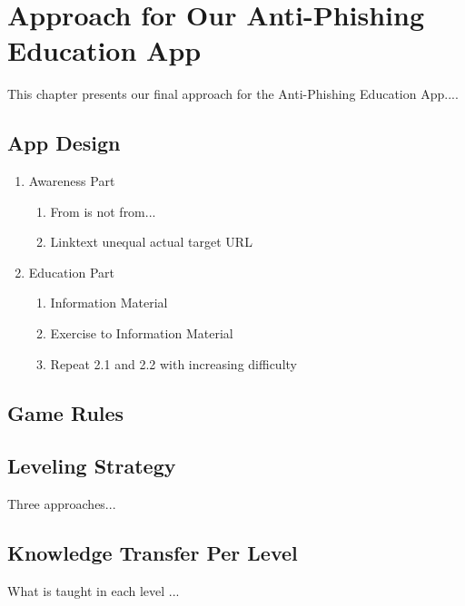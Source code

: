 
\section{Approach for Our Anti-Phishing Education App}
\label{s:approach}
This chapter presents our final approach for the Anti-Phishing Education App....
\subsection{App Design}
\begin{enumerate}
	\item Awareness Part
	\begin{enumerate}
		\item From is not from...
		\item Linktext unequal actual target URL
	\end{enumerate}
	\item Education Part
	\begin{enumerate}
		\item Information Material
		\item Exercise to Information Material
		\item Repeat 2.1 and 2.2 with increasing difficulty
	\end{enumerate}
\end{enumerate}

\subsection{Game Rules}

\subsection{Leveling Strategy}
Three approaches...

\subsection{Knowledge Transfer Per Level}
What is taught in each level ... 

